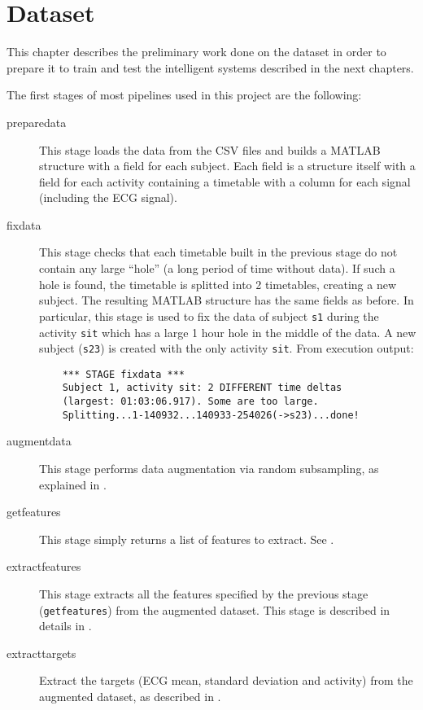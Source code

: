 \chapter{Dataset}\label{ch:dataset}

This chapter describes the preliminary work done on the dataset in order to
prepare it to train and test the intelligent systems described in the next
chapters.

The first stages of most pipelines used in this project are the following:
\begin{description}
\item[preparedata] This stage loads the data from the CSV files and builds a
	MATLAB structure with a field for each subject. Each field is a
	structure itself with a field for each activity containing a timetable
	with a column for each signal (including the ECG signal).
\item[fixdata] This stage checks that each timetable built in the previous
	stage do not contain any large ``hole'' (a long period of time without
	data). If such a hole is found, the timetable is splitted into 2
	timetables, creating a new subject. The resulting MATLAB structure has
	the same fields as before. In particular, this stage is used to fix the
	data of subject \texttt{s1} during the activity \texttt{sit} which has
	a large 1 hour hole in the middle of the data. A new subject
	(\texttt{s23}) is created with the only activity \texttt{sit}. From
	execution output:
	\begin{verbatim}
	*** STAGE fixdata ***
	Subject 1, activity sit: 2 DIFFERENT time deltas
	(largest: 01:03:06.917). Some are too large.
	Splitting...1-140932...140933-254026(->s23)...done!
	\end{verbatim}
\item[augmentdata] This stage performs data augmentation via random
	subsampling, as explained in .
\item[getfeatures] This stage simply returns a list of features to extract. See
	.
\item[extractfeatures] This stage extracts all the features specified by the
	previous stage (\texttt{getfeatures}) from the augmented dataset. This
	stage is described in details in .
\item[extracttargets] Extract the targets (ECG mean, standard deviation and
	activity) from the augmented dataset, as described in
	.
\end{description}




